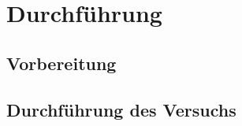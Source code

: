 \section{Durchführung}
\label{sec:Durchfuehrung}
\subsection{Vorbereitung}

\subsection{Durchführung des Versuchs}
